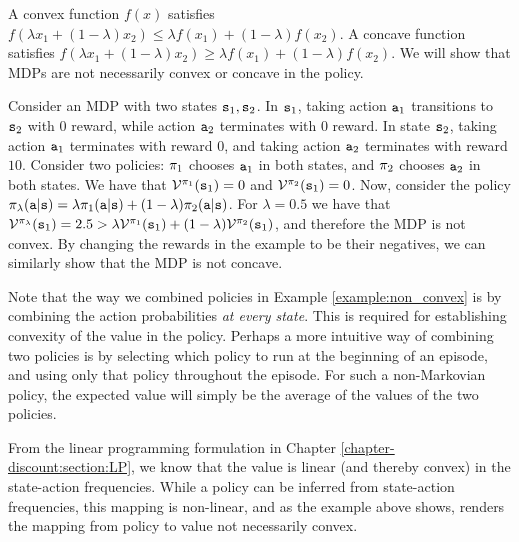 \begin{example}\label{example:non_convex}
    A convex function $f(x)$ satisfies $f(\lambda x_1 + (1-\lambda) x_2) \leq \lambda f(x_1) + (1-\lambda) f(x_2)$. A concave function satisfies $f(\lambda x_1 + (1-\lambda) x_2) \geq \lambda f(x_1) + (1-\lambda) f(x_2)$.
    We will show that MDPs are not necessarily convex or concave in the policy.

    Consider an MDP with two states ${\tt s}_1, {\tt s}_2$. In ${\tt s}_1$, taking action ${\tt a}_1$ transitions to ${\tt s}_2$ with 0 reward, while action ${\tt a}_2$ terminates with 0 reward. In state ${\tt s}_2$, taking action ${\tt a}_1$ terminates with reward $0$, and taking action ${\tt a}_2$ terminates with reward $10$. Consider two policies: $\pi_1$ chooses ${\tt a}_1$ in both states, and $\pi_2$ chooses ${\tt a}_2$ in both states. We have that $\mathcal{V}^{\pi_1}({\tt s}_1) = 0$ and $\mathcal{V}^{\pi_2}({\tt s}_1) = 0$. 
    Now, consider the policy $\pi_\lambda({\tt a}|{\tt s}) = \lambda \pi_1({\tt a}|{\tt s}) + (1-\lambda)\pi_2({\tt a}|{\tt s})$. For $\lambda=0.5$ we have that $\mathcal{V}^{\pi_\lambda}({\tt s}_1) = 2.5 > \lambda \mathcal{V}^{\pi_1}({\tt s}_1) + (1-\lambda) \mathcal{V}^{\pi_2}({\tt s}_1)$, and therefore the MDP is not convex. 
    By changing the rewards in the example to be their negatives, we can similarly show that the MDP is not concave.
\end{example}

\begin{remark}
    Note that the way we combined policies in Example \ref{example:non_convex} is by combining the action probabilities \textit{at every state}. This is required for establishing convexity of the value in the policy. Perhaps a more intuitive way of combining two policies is by selecting which policy to run at the beginning of an episode, and using only that policy throughout the episode. For such a non-Markovian policy, the expected value will simply be the average of the values of the two policies.
\end{remark}

\begin{remark}
    From the linear programming formulation in Chapter \ref{chapter-discount:section:LP}, we know that the value is linear (and thereby convex) in the state-action frequencies. While a policy can be inferred from state-action frequencies, this mapping is non-linear, and as the example above shows, renders the mapping from policy to value not necessarily convex.
\end{remark}

